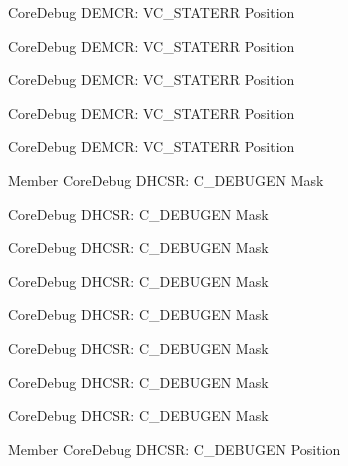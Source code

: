 \begin{DoxyRefList}
\label{deprecated__deprecated000347}%
%
Core\+Debug DEMCR\+: VC\+\_\+\+STATERR Position 

\label{deprecated__deprecated000512}%
%
Core\+Debug DEMCR\+: VC\+\_\+\+STATERR Position 

\label{deprecated__deprecated000423}%
%
Core\+Debug DEMCR\+: VC\+\_\+\+STATERR Position 

\label{deprecated__deprecated000205}%
%
Core\+Debug DEMCR\+: VC\+\_\+\+STATERR Position 

\label{deprecated__deprecated000614}%
%
Core\+Debug DEMCR\+: VC\+\_\+\+STATERR Position  
\item[Member \doxylink{group__CMSIS__CoreDebug_gab815c741a4fc2a61988cd2fb7594210b}{Core\+Debug\+\_\+\+DHCSR\+\_\+\+C\+\_\+\+DEBUGEN\+\_\+\+Msk} ]\label{deprecated__deprecated000491}%
%
Core\+Debug DHCSR\+: C\+\_\+\+DEBUGEN Mask 

\label{deprecated__deprecated000184}%
%
Core\+Debug DHCSR\+: C\+\_\+\+DEBUGEN Mask 

\label{deprecated__deprecated000040}%
%
Core\+Debug DHCSR\+: C\+\_\+\+DEBUGEN Mask 

\label{deprecated__deprecated000267}%
%
Core\+Debug DHCSR\+: C\+\_\+\+DEBUGEN Mask 

\label{deprecated__deprecated000593}%
%
Core\+Debug DHCSR\+: C\+\_\+\+DEBUGEN Mask 

\label{deprecated__deprecated000128}%
%
Core\+Debug DHCSR\+: C\+\_\+\+DEBUGEN Mask 

\label{deprecated__deprecated000326}%
%
Core\+Debug DHCSR\+: C\+\_\+\+DEBUGEN Mask 

\label{deprecated__deprecated000402}%
%
Core\+Debug DHCSR\+: C\+\_\+\+DEBUGEN Mask  
\item[Member \doxylink{group__CMSIS__CoreDebug_gab557abb5b172b74d2cf44efb9d824e4e}{Core\+Debug\+\_\+\+DHCSR\+\_\+\+C\+\_\+\+DEBUGEN\+\_\+\+Pos} ]\label{deprecated__deprecated000325}%
%
Core\+Debug DHCSR\+: C\+\_\+\+DEBUGEN Position 


\end{DoxyRefList}
